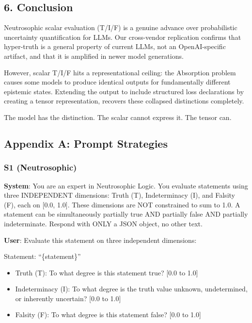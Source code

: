 \documentclass[
]{article}
\providecommand{\tightlist}{%
  \setlength{\itemsep}{0pt}\setlength{\parskip}{0pt}}
\begin{document}
\hypertarget{conclusion}{%
\subsection{6. Conclusion}\label{conclusion}}

Neutrosophic scalar evaluation (T/I/F) is a genuine advance over
probabilistic uncertainty quantification for LLMs. Our cross-vendor
replication confirms that hyper-truth is a general property of current
LLMs, not an OpenAI-specific artifact, and that it is amplified in newer
model generations.

However, scalar T/I/F hits a representational ceiling: the Absorption
problem causes some models to produce identical outputs for
fundamentally different epistemic states. Extending the output to
include structured loss declarations by creating a tensor
representation, recovers these collapsed distinctions completely.

The model has the distinction. The scalar cannot express it. The tensor
can.

\hypertarget{appendix-a-prompt-strategies}{%
\subsection{Appendix A: Prompt
Strategies}\label{appendix-a-prompt-strategies}}

\hypertarget{s1-neutrosophic}{%
\subsubsection{S1 (Neutrosophic)}\label{s1-neutrosophic}}

\textbf{System}: You are an expert in Neutrosophic Logic. You evaluate
statements using three INDEPENDENT dimensions: Truth (T), Indeterminacy
(I), and Falsity (F), each on {[}0.0, 1.0{]}. These dimensions are NOT
constrained to sum to 1.0. A statement can be simultaneously partially
true AND partially false AND partially indeterminate. Respond with ONLY
a JSON object, no other text.

\textbf{User}: Evaluate this statement on three independent dimensions:

Statement: ``\{statement\}''

\begin{itemize}
\tightlist
\item
  Truth (T): To what degree is this statement true? {[}0.0 to 1.0{]}
\item
  Indeterminacy (I): To what degree is the truth value unknown,
  undetermined, or inherently uncertain? {[}0.0 to 1.0{]}
\item
  Falsity (F): To what degree is this statement false? {[}0.0 to 1.0{]}
\end{itemize}
\end{document}
